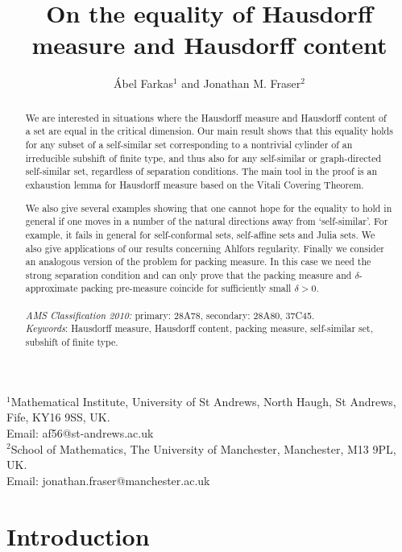 \documentclass[11pt,english,british]{article}
\title{On the equality of Hausdorff measure and Hausdorff content}
\author{\'Abel Farkas$^{1}$ and Jonathan M. Fraser$^{2}$}
\numberwithin{equation}{section}
\begin{document}
      \maketitle

\begin{center}
$^1$Mathematical Institute, University of St Andrews, North Haugh, St Andrews, Fife, KY16 9SS, UK.\\
Email: af56@st-andrews.ac.uk
\\ \vspace{3mm} 
  $^2$School of Mathematics, The University of Manchester, Manchester, M13 9PL, UK.\\
  Email: jonathan.fraser@manchester.ac.uk
\end{center}
\vspace{0mm}

\begin{abstract}
We are interested in situations where the Hausdorff measure and Hausdorff content of a set are equal in the critical dimension.  Our main result shows that this equality holds for any subset of a self-similar set corresponding to a nontrivial cylinder of an irreducible subshift of finite type, and thus also for any self-similar or graph-directed self-similar set, regardless of separation conditions.  The main tool in the proof is an exhaustion lemma for Hausdorff measure based on the Vitali Covering Theorem.

We also give several examples showing that one cannot hope for the equality to hold in general if one moves in a number of the natural directions away from `self-similar'.  For example, it fails in general for self-conformal sets, self-affine sets and Julia sets.  We also give applications of our results concerning Ahlfors regularity.  Finally we consider an analogous version of the problem for packing measure.  In this case we need the strong separation condition and can only prove that the packing measure and $\delta$-approximate packing pre-measure coincide for sufficiently small $\delta>0$.
\\ \\
\noindent \emph{AMS Classification 2010:} primary: 28A78, secondary: 28A80, 37C45. \\
\noindent \emph{Keywords}: Hausdorff measure, Hausdorff content, packing measure, self-similar set, subshift of finite type.

\end{abstract}

\section{Introduction}
\end{document}
